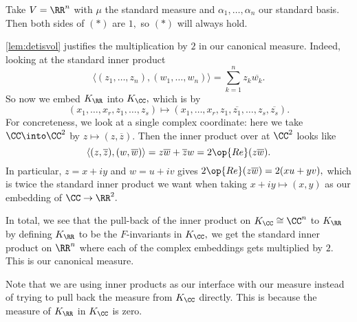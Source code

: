\begin{example}
    Take $V=\RR^n$ with $\mu$ the standard measure and $\alpha_1,\ldots,\alpha_n$ our standard basis. Then both sides of $(*)$ are $1,$ so $(*)$ will always hold.
\end{example}
\autoref{lem:detisvol} justifies the multiplication by $2$ in our canonical measure. Indeed, looking at the standard inner product
\[\langle (z_1,\ldots,z_n),(w_1,\ldots,w_n)\rangle=\sum_{k=1}^nz_k\overline{w_k}.\]
So now we embed $K_\RR$ into $K_\CC,$ which is by
\[(x_1,\ldots,x_r,z_1,\ldots,z_s)\longmapsto(x_1,\ldots,x_r,z_1,\overline{z_1},\ldots,z_s,\overline{z_s}).\]
For concreteness, we look at a single complex coordinate: here we take $\CC\into\CC^2$ by $z\mapsto(z,\overline z).$ Then the inner product over at $\CC^2$ looks like
\[\langle(z,\overline z),(w,\overline w)\rangle=z\overline w+\overline zw=2\op{Re}(z\overline w).\]
In particular, $z=x+iy$ and $w=u+iv$ gives $2\op{Re}(z\overline w)=2(xu+yv),$ which is twice the standard inner product we want when taking $x+iy\mapsto(x,y)$ as our embedding of $\CC\to\RR^2.$

In total, we see that the pull-back of the inner product on $K_\CC\cong\CC^n$ to $K_\RR$ by defining $K_\RR$ to be the $F$-invariants in $K_\CC,$ we get the standard inner product on $\RR^n$ where each of the complex embeddings gets multiplied by $2.$ This is our canonical measure.
\begin{remark}
    Note that we are using inner products as our interface with our measure instead of trying to pull back the measure from $K_\CC$ directly. This is because the measure of $K_\RR$ in $K_\CC$ is zero.
\end{remark}

